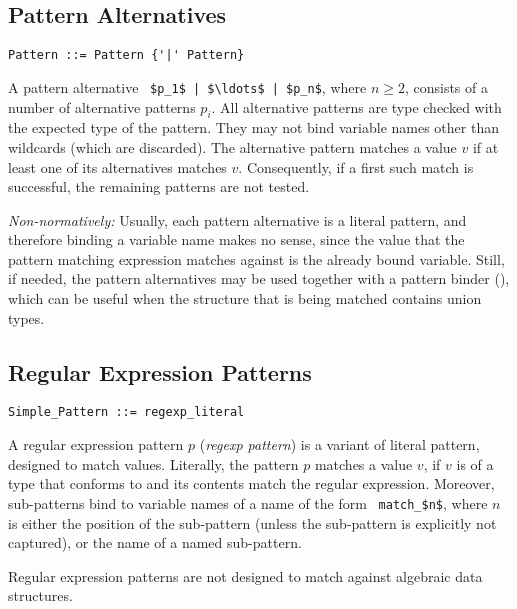 \subsection{Pattern Alternatives}
\label{sec:pattern-alternatives}

\syntax\begin{lstlisting}
Pattern ::= Pattern {'|' Pattern}
\end{lstlisting}

A pattern alternative ~\lstinline!$p_1$ | $\ldots$ | $p_n$!, where $n \geq 2$, consists of a number of alternative patterns $p_i$. All alternative patterns are type checked with the expected type of the pattern. They may not bind variable names other than wildcards (which are discarded). The alternative pattern matches a value $v$ if at least one of its alternatives matches $v$. Consequently, if a first such match is successful, the remaining patterns are not tested.

{\em Non-normatively:} Usually, each pattern alternative is a literal pattern, and therefore binding a variable name makes no sense, since the value that the pattern matching expression matches against is the already bound variable. Still, if needed, the pattern alternatives may be used together with a pattern binder (), which can be useful when the structure that is being matched contains union types. 





\subsection{Regular Expression Patterns}
\label{sec:regexp-patterns}

\syntax\begin{lstlisting}
Simple_Pattern ::= regexp_literal
\end{lstlisting}

A regular expression pattern $p$ ({\em regexp pattern}) is a variant of literal pattern, designed to match  values. Literally, the pattern $p $ matches a value $v$, if $v$ is of a type that conforms to  and its contents match the regular expression. Moreover, sub-patterns bind to variable names of a name of the form ~\lstinline!match_$n$!, where $n$ is either the position of the sub-pattern (unless the sub-pattern is explicitly not captured), or the name of a named sub-pattern. 

Regular expression patterns are not designed to match against algebraic data structures. 

